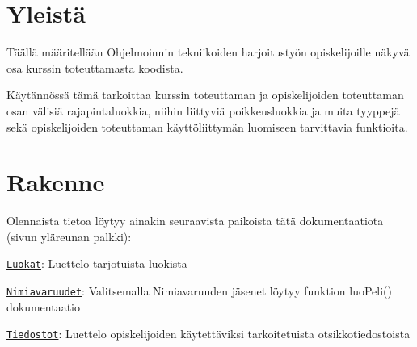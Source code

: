 \hypertarget{index_Yleistä}{}\section{Yleistä}\label{index_Yleistä}
Täällä määritellään Ohjelmoinnin tekniikoiden harjoitustyön opiskelijoille näkyvä osa kurssin toteuttamasta koodista.

Käytännössä tämä tarkoittaa kurssin toteuttaman ja opiskelijoiden toteuttaman osan välisiä rajapintaluokkia, niihin liittyviä poikkeusluokkia ja muita tyyppejä sekä opiskelijoiden toteuttaman käyttöliittymän luomiseen tarvittavia funktioita.\hypertarget{index_Rakenne}{}\section{Rakenne}\label{index_Rakenne}
Olennaista tietoa löytyy ainakin seuraavista paikoista tätä dokumentaatiota (sivun yläreunan palkki)\-:
\begin{DoxyItemize}
\item \href{annotated.html}{\tt Luokat}\-: Luettelo tarjotuista luokista
\item \href{namespaces.html}{\tt Nimiavaruudet}\-: Valitsemalla Nimiavaruuden jäsenet löytyy funktion {\ttfamily luo\-Peli()} dokumentaatio
\item \href{files.html}{\tt Tiedostot}\-: Luettelo opiskelijoiden käytettäviksi tarkoitetuista otsikkotiedostoista 
\end{DoxyItemize}